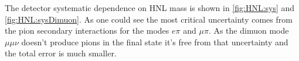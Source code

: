 \documentclass[../main.tex]{subfiles}
\begin{document}
\begin{comment}
The results of all the systematic study are presented in \autoref{tab:HNL:sys}.
\begin{table}[!ht]
\begin{center}
\begin{tabular}{|l |c| c| c|}
  \hline
   & $\mu\pi$ & $e\pi$ & $\mu\mu\nu$\\
  \hline
  \multicolumn{4}{||l|}{Variation-like} \\
  \hline
  B Field distortions                 & 0.48\%    & 0.37\%         &  0.02\%\\
  TPC momentum scale                  & 0.03\%    & 0.01\%         & 0.04\%\\
  TPC momentum resolution             & 2.34\%    & 0.78\%         & 0.46\%\\
  TPC PID                             & 0.41\%    & 0.75\%         & 1\%\\
  \hline
  \multicolumn{4}{||l|}{Efficiency-like} \\
  \hline
  TPC cluster efficiency              &   $\ll1\%$   &   $\ll1\%$  &  0.01\%\\
  TPC tracking efficiency             &   0.44\%     &  0.34 \%    & 0.46\% \\
  TPC charge ID efficiency            &   0.04\%     &   0.21\%    &   0.76\%\\
  TPC-FGD matching                    &   0.27\%     &    $\ll1\%$ & 0.03\%\\
  Pion secondary interactions         &   3.88\%     &   2.91\%    &  - \\
  Global vertex combining             &    0.58\%    &  0.52\%     & 0.48\%\\
  ECal PID                            &     -        &     -       & 0.27\%\\
  ECal TPC matching                   &     -        &     -       &  0.01\%\\
  \hline
  Total                               &   4.64\%     &  3.20\%     & 1.51\%\\
  \hline
\end{tabular}
\caption{Detector systematics summary.}
\label{tab:HNL:sys}
\end{center}
\end{table}
\end{comment}

The detector systematic dependence on HNL mass is shown in \autoref{fig:HNL:sys} and \autoref{fig:HNL:sysDimuon}. As one could see the most critical uncertainty comes from the pion secondary interactions for the modes $e\pi$ and $\mu\pi$. As the dimuon mode $\mu\mu\nu$ doesn't produce pions in the final state it's free from that uncertainty and the total error is much smaller.
\end{document}
